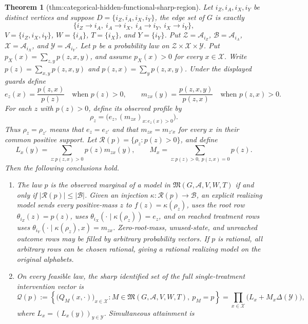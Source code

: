 \documentclass{article}
\newtheorem{theorem}{Theorem}
\begin{document}
\begin{theorem}[thm:categorical-hidden-functional-sharp-region]\label{thm:categorical-hidden-functional-sharp-region}
Let \(i_Z,i_A,i_X,i_Y\) be distinct vertices and suppose
\(D=\{i_Z,i_A,i_X,i_Y\}\), the edge set of \(G\) is exactly
\[
\{i_Z\mathbin{\to} i_A,\ i_A\mathbin{\to} i_X,
  \ i_A\mathbin{\to} i_Y,\ i_X\mathbin{\to} i_Y\},
\]
\(V=\{i_Z,i_X,i_Y\}\), \(W=\{i_A\}\), \(T=\{i_X\}\), and
\(Y=\{i_Y\}\).  Put
\(\mathcal Z=\mathcal A_{i_Z}\), \(\mathcal B=\mathcal A_{i_A}\),
\(\mathcal X=\mathcal A_{i_X}\), and \(\mathcal Y=\mathcal A_{i_Y}\).
Let \(p\) be a probability law on
\(\mathcal Z\times\mathcal X\times\mathcal Y\).  Put
\(p_X(x)=\sum_{z,y}p(z,x,y)\), and assume \(p_X(x)>0\) for every
\(x\in\mathcal X\).  Write
\(p(z)=\sum_{x,y}p(z,x,y)\) and \(p(z,x)=\sum_y p(z,x,y)\).  Under
the displayed guards define
\[
 e_z(x)=\frac{p(z,x)}{p(z)}\quad\text{when }p(z)>0,
 \qquad
 m_{zx}(y)=\frac{p(z,x,y)}{p(z,x)}\quad\text{when }p(z,x)>0.
\]
For each \(z\) with \(p(z)>0\), define its observed profile by
\[
 \rho_z=\bigl(e_z,(m_{zx})_{x:e_z(x)>0}\bigr).
\]
Thus \(\rho_z=\rho_{z'}\) means that \(e_z=e_{z'}\) and that
\(m_{zx}=m_{z'x}\) for every \(x\) in their common positive support.  Let
\(\mathcal R(p)=\{\rho_z:p(z)>0\}\), and define
\[
 L_x(y)=\sum_{z:p(z,x)>0}p(z)m_{zx}(y),
 \qquad
 M_x=\sum_{z:p(z)>0,\ p(z,x)=0}p(z).
\]
Then the following conclusions hold.
\begin{enumerate}
\item The law \(p\) is the observed marginal of a model in
\(\mathfrak M(G,\mathcal A,V,W,T)\) if and only if
\(\lvert\mathcal R(p)\rvert\leq\lvert\mathcal B\rvert\).  Given an
injection \(\kappa:\mathcal R(p)\to\mathcal B\), an explicit realizing
model sends every positive-mass \(z\) to
\(f(z)=\kappa(\rho_z)\), uses the root row
\(\theta_{i_Z}(z)=p(z)\), uses
\(\theta_{i_X}(\cdot\mid\kappa(\rho_z))=e_z\), and on reached treatment
rows uses \(\theta_{i_Y}(\cdot\mid\kappa(\rho_z),x)=m_{zx}\).  Zero-root-mass,
unused-state, and unreached outcome rows may be filled by arbitrary
probability vectors.  If \(p\) is rational, all arbitrary rows can be
chosen rational, giving a rational realizing model on the original
alphabets.
\item On every feasible law, the sharp identified set of the full
single-treatment intervention vector is
\[
 \mathcal Q(p)
 :=\left\{\bigl(Q_M(x,\cdot)\bigr)_{x\in\mathcal X}:
 M\in\mathfrak M(G,\mathcal A,V,W,T),\ p_M=p\right\}
 =\prod_{x\in\mathcal X}\bigl(L_x+M_x\Delta(\mathcal Y)\bigr),
\]
where \(L_x=(L_x(y))_{y\in\mathcal Y}\).  Simultaneous attainment is

\end{enumerate}
\end{theorem}
\end{document}
